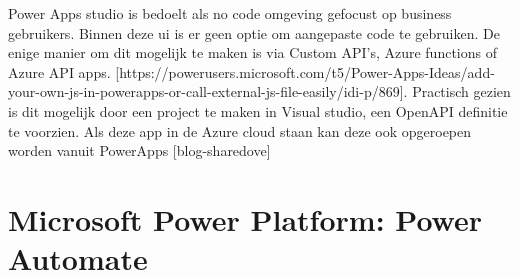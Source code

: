 Power Apps studio is bedoelt als no code omgeving gefocust op business gebruikers. Binnen deze ui is er geen optie om aangepaste code te gebruiken. De enige manier om dit mogelijk te maken is via Custom API's, Azure functions of Azure API apps. [https://powerusers.microsoft.com/t5/Power-Apps-Ideas/add-your-own-js-in-powerapps-or-call-external-js-file-easily/idi-p/869].
Practisch gezien is dit mogelijk door een project te maken in Visual studio, een OpenAPI definitie te voorzien. Als deze app in de Azure cloud staan kan deze ook opgeroepen worden vanuit PowerApps [blog-sharedove]

\section{Microsoft Power Platform: Power Automate}

